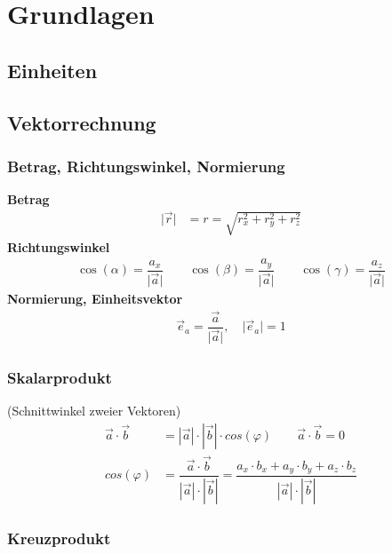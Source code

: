 \section{Grundlagen}
\subsection{Einheiten}

\subsection{Vektorrechnung}
\subsubsection{Betrag, Richtungswinkel, Normierung}
\textbf{Betrag}
\begin{align*}
	\vert \vec{r}  \vert & = r = \sqrt{r^2_x + r^2_y + r^2_z}
\end{align*}
\textbf{Richtungswinkel}
\begin{align*}
	\cos(\alpha) = \dfrac{a_x}{\vert \vec{a} \vert} \qquad \cos(\beta) = \dfrac{a_y}{\vert \vec{a} \vert} \qquad
	\cos(\gamma) = \dfrac{a_z}{\vert \vec{a} \vert}
\end{align*}
\textbf{Normierung, Einheitsvektor}
\begin{align*}
	\vec{e}_a =  \dfrac{\vec{a}}{\vert \vec{a} \vert}, \quad \vert \vec{e}_a \vert = 1
\end{align*}

\subsubsection{Skalarprodukt} (Schnittwinkel zweier Vektoren)
\begin{align*}
	\vec{a} \cdot \vec{b} & = |\vec{a}| \cdot |\vec{b}| \cdot cos(\varphi) \qquad \vec{a} \cdot \vec{b}  = 0\\
	cos(\varphi)          &  = \dfrac{\vec{a} \cdot \vec{b}}{|\vec{a}| \cdot |\vec{b}|} = \dfrac{a_x \cdot b_x + a_y \cdot b_y + a_z \cdot b_z}{|\vec{a}| \cdot |\vec{b}|}
\end{align*}

\subsubsection{Kreuzprodukt}

